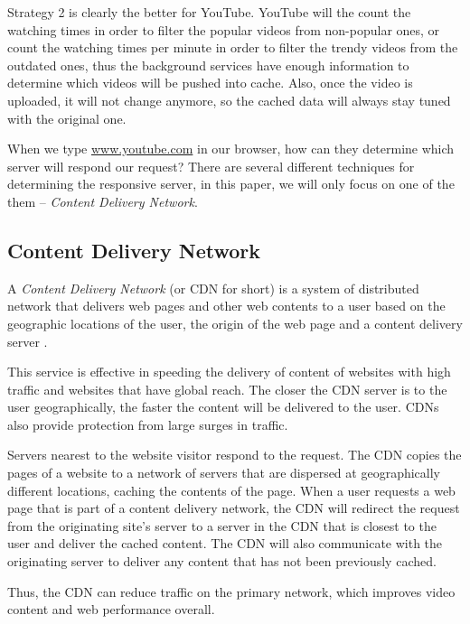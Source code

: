 Strategy 2 is clearly the better for YouTube. YouTube will the count the watching times in order to filter the popular videos from non-popular ones, or count the watching times per minute in order to filter the trendy videos from the outdated ones, thus the background services have enough information to determine which videos will be pushed into cache. Also, once the video is uploaded, it will not change anymore, so the cached data will always stay tuned with the original one.

When we type \url{www.youtube.com} in our browser, how can they determine which server will respond our request? There are several different techniques for determining the responsive server, in this paper, we will only focus on one of the them -- \textit{Content Delivery Network}.

\subsection{Content Delivery Network}
A \textit{Content Delivery Network} (or CDN for short) is a system of distributed network that delivers web pages and other web contents to a user based on the geographic locations of the user, the origin of the web page and a content delivery server \cite{webopedia:cdn}.

This service is effective in speeding the delivery of content of websites with high traffic and websites that have global reach. The closer the CDN server is to the user geographically, the faster the content will be delivered to the user. CDNs also provide protection from large surges in traffic.

Servers nearest to the website visitor respond to the request. The CDN copies the pages of a website to a network of servers that are dispersed at geographically different locations, caching the contents of the page. When a user requests a web page that is part of a content delivery network, the CDN will redirect the request from the originating site's server to a server in the CDN that is closest to the user and deliver the cached content. The CDN will also communicate with the originating server to deliver any content that has not been previously cached.

Thus, the CDN can reduce traffic on the primary network, which improves video content and web performance overall.
